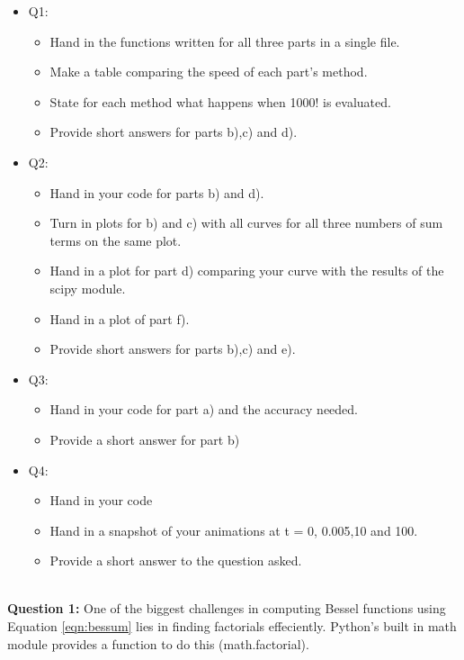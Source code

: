 \documentclass[a4paper,12pt]{article}
\begin{document}
\begin{itemize}
\item Q1: 
  \begin{itemize}
    \item Hand in the functions written for all three parts in a single file. 
    \item Make a table comparing the speed of each part's method. 
    \item State for each method what happens when 1000! is evaluated. 
    \item Provide short answers for parts b),c) and d).
  \end{itemize}

\item Q2: 
  \begin{itemize}
    \item Hand in your code for parts b) and d).
    \item Turn in plots for b) and c) with all curves for all three numbers of sum terms on the same plot. 
    \item Hand in a plot for part d) comparing your curve with the results of the scipy module. 
    \item Hand in a plot of part f). 
    \item Provide short answers for parts b),c) and e).
  \end{itemize}

\item Q3: 
  \begin{itemize}
    \item Hand in your code for part a) and the accuracy needed.
    \item Provide a short answer for part b)
  \end{itemize}

\item Q4:
  \begin{itemize}
    \item Hand in your code
    \item Hand in a snapshot of your animations at t = 0, 0.005,10 and 100.
    \item Provide a short answer to the question asked.
  \end{itemize}
\end{itemize}
\\
\textbf{Question 1:} One of the biggest challenges in computing Bessel functions using Equation \ref{eqn:bessum} lies in finding factorials effeciently. Python's built in math module provides a function to do this (math.factorial).\\
\end{document}
